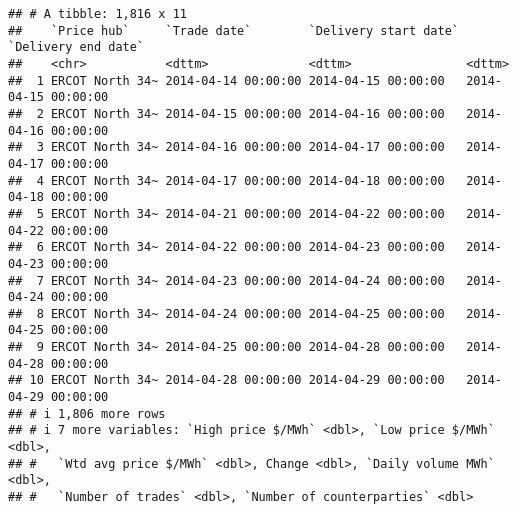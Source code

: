 \documentclass[
]{article}
\newenvironment{Shaded}{\begin{snugshade}}{\end{snugshade}}
\newcommand{\AttributeTok}[1]{\textcolor[rgb]{0.13,0.29,0.53}{#1}}
\newcommand{\CommentTok}[1]{\textcolor[rgb]{0.56,0.35,0.01}{\textit{#1}}}
\newcommand{\FunctionTok}[1]{\textcolor[rgb]{0.13,0.29,0.53}{\textbf{#1}}}
\newcommand{\NormalTok}[1]{#1}
\newcommand{\SpecialCharTok}[1]{\textcolor[rgb]{0.81,0.36,0.00}{\textbf{#1}}}
\newcommand{\StringTok}[1]{\textcolor[rgb]{0.31,0.60,0.02}{#1}}
\begin{document}
\begin{Shaded}
\end{Shaded}

\begin{verbatim}
## # A tibble: 1,816 x 11
##    `Price hub`     `Trade date`        `Delivery start date` `Delivery end date`
##    <chr>           <dttm>              <dttm>                <dttm>             
##  1 ERCOT North 34~ 2014-04-14 00:00:00 2014-04-15 00:00:00   2014-04-15 00:00:00
##  2 ERCOT North 34~ 2014-04-15 00:00:00 2014-04-16 00:00:00   2014-04-16 00:00:00
##  3 ERCOT North 34~ 2014-04-16 00:00:00 2014-04-17 00:00:00   2014-04-17 00:00:00
##  4 ERCOT North 34~ 2014-04-17 00:00:00 2014-04-18 00:00:00   2014-04-18 00:00:00
##  5 ERCOT North 34~ 2014-04-21 00:00:00 2014-04-22 00:00:00   2014-04-22 00:00:00
##  6 ERCOT North 34~ 2014-04-22 00:00:00 2014-04-23 00:00:00   2014-04-23 00:00:00
##  7 ERCOT North 34~ 2014-04-23 00:00:00 2014-04-24 00:00:00   2014-04-24 00:00:00
##  8 ERCOT North 34~ 2014-04-24 00:00:00 2014-04-25 00:00:00   2014-04-25 00:00:00
##  9 ERCOT North 34~ 2014-04-25 00:00:00 2014-04-28 00:00:00   2014-04-28 00:00:00
## 10 ERCOT North 34~ 2014-04-28 00:00:00 2014-04-29 00:00:00   2014-04-29 00:00:00
## # i 1,806 more rows
## # i 7 more variables: `High price $/MWh` <dbl>, `Low price $/MWh` <dbl>,
## #   `Wtd avg price $/MWh` <dbl>, Change <dbl>, `Daily volume MWh` <dbl>,
## #   `Number of trades` <dbl>, `Number of counterparties` <dbl>
\end{verbatim}
\end{document}
